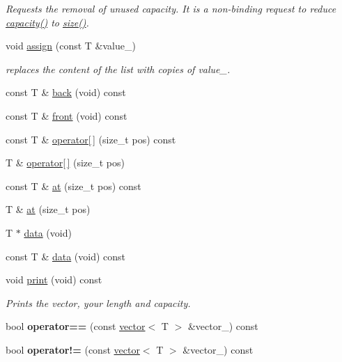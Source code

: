 \begin{DoxyCompactItemize}
\begin{DoxyCompactList}\small\item\em Requests the removal of unused capacity. It is a non-\/binding request to reduce \hyperlink{classls_1_1vector_a0b17323cda5ab83ead28a6822e55f762}{capacity()} to \hyperlink{classls_1_1vector_a4a84ae30c023098a222fd9fac055284f}{size()}. \end{DoxyCompactList}\item 
void \hyperlink{classls_1_1vector_a87ab7797a6d790b10bc3cd59a623307f}{assign} (const T \&value\+\_\+)
\begin{DoxyCompactList}\small\item\em replaces the content of the list with copies of value\+\_\+. \end{DoxyCompactList}\item 
const T \& \hyperlink{classls_1_1vector_ad352ce6f460b75679c513072f46df9b1}{back} (void) const 
\item 
const T \& \hyperlink{classls_1_1vector_aed4947977bcffd8d5de6f12dcc184783}{front} (void) const 
\item 
const T \& \hyperlink{classls_1_1vector_a2596646005e53dae4cd5b70e162753d9}{operator\mbox{[}$\,$\mbox{]}} (size\+\_\+t pos) const 
\item 
T \& \hyperlink{classls_1_1vector_a117304c2fe77e2029c2cff192ee8408e}{operator\mbox{[}$\,$\mbox{]}} (size\+\_\+t pos)
\item 
const T \& \hyperlink{classls_1_1vector_ada2e9b5c5a5c26fcff900b0535d552a6}{at} (size\+\_\+t pos) const 
\item 
T \& \hyperlink{classls_1_1vector_ae2991846c7bd6e784812b5fc4fde48d2}{at} (size\+\_\+t pos)
\item 
T $\ast$ \hyperlink{classls_1_1vector_af45c98122fbb8d63e53a4f33b2bc3124}{data} (void)
\item 
const T \& \hyperlink{classls_1_1vector_a53604239af9e47406e6c0abaa1d8a397}{data} (void) const 
\item 
void \hyperlink{classls_1_1vector_a3385ac2f08588740f6da7e5d6a1096c5}{print} (void) const \hypertarget{classls_1_1vector_a3385ac2f08588740f6da7e5d6a1096c5}{}\label{classls_1_1vector_a3385ac2f08588740f6da7e5d6a1096c5}

\begin{DoxyCompactList}\small\item\em Prints the vector, your length and capacity. \end{DoxyCompactList}\item 
bool {\bfseries operator==} (const \hyperlink{classls_1_1vector}{vector}$<$ T $>$ \&vector\+\_\+) const \hypertarget{classls_1_1vector_aed89d4f7a583b5052ef2300c3119a01c}{}\label{classls_1_1vector_aed89d4f7a583b5052ef2300c3119a01c}

\item 
bool {\bfseries operator!=} (const \hyperlink{classls_1_1vector}{vector}$<$ T $>$ \&vector\+\_\+) const \hypertarget{classls_1_1vector_ab311be0ea74e243dddd556983a5c984f}{}\label{classls_1_1vector_ab311be0ea74e243dddd556983a5c984f}

\end{DoxyCompactItemize}



